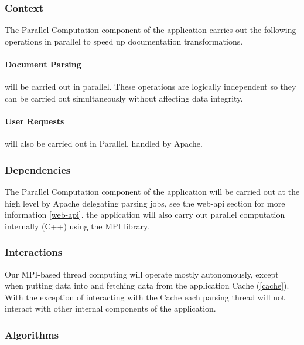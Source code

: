 \subsubsection{Context}

The Parallel Computation component of the application carries out the following operations in parallel to speed up documentation transformations.

\paragraph{Document Parsing} will be carried out in parallel.
These operations are logically independent so they can be carried out simultaneously without affecting data integrity.

\paragraph{User Requests} will also be carried out in Parallel, handled by Apache.

\subsubsection{Dependencies}

The Parallel Computation component of the application will be carried out at the high level by Apache delegating parsing jobs, see the \gls{web-api} section for more information \ref{web-api}.
the application will also carry out parallel computation internally (C++) using the MPI library.

\subsubsection{Interactions}

Our MPI-based thread computing will operate mostly autonomously, except when putting data into and fetching data from the application Cache (\ref{cache}).
With the exception of interacting with the Cache each parsing thread will not interact with other internal components of the application.

\subsubsection{Algorithms}

